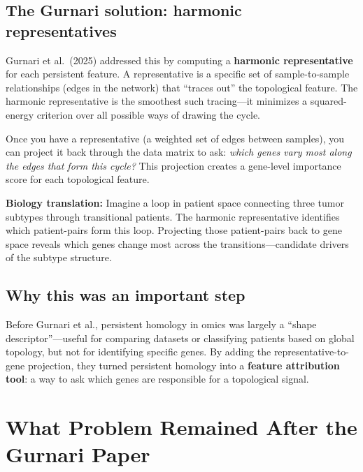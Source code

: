 \documentclass[11pt]{article}
\makeatletter
\newenvironment{biobox}{%
  \par\vspace{8pt}\noindent\fboxrule=1pt\fboxsep=8pt%
  \begin{lrbox}{\@tempboxa}\begin{minipage}{\dimexpr\linewidth-2\fboxsep-2\fboxrule}}%
  {\end{minipage}\end{lrbox}\fcolorbox{green!40!black}{white}{\usebox{\@tempboxa}}\par\vspace{8pt}}
\makeatother
\begin{document}
\subsection{The Gurnari solution: harmonic representatives}

Gurnari et al.\ (2025) addressed this by computing a \textbf{harmonic representative} for each persistent feature.
A representative is a specific set of sample-to-sample relationships (edges in the network) that ``traces out'' the topological feature.
The harmonic representative is the smoothest such tracing---it minimizes a squared-energy criterion over all possible ways of drawing the cycle.

Once you have a representative (a weighted set of edges between samples), you can project it back through the data matrix to ask: \emph{which genes vary most along the edges that form this cycle?}
This projection creates a gene-level importance score for each topological feature.

\begin{biobox}
\textbf{Biology translation:} Imagine a loop in patient space connecting three tumor subtypes through transitional patients.
The harmonic representative identifies which patient-pairs form this loop.
Projecting those patient-pairs back to gene space reveals which genes change most across the transitions---candidate drivers of the subtype structure.
\end{biobox}

\subsection{Why this was an important step}

Before Gurnari et al., persistent homology in omics was largely a ``shape descriptor''---useful for comparing datasets or classifying patients based on global topology, but not for identifying specific genes.
By adding the representative-to-gene projection, they turned persistent homology into a \textbf{feature attribution tool}: a way to ask which genes are responsible for a topological signal.

\section{What Problem Remained After the Gurnari Paper}
\label{sec:gap}
\end{document}
